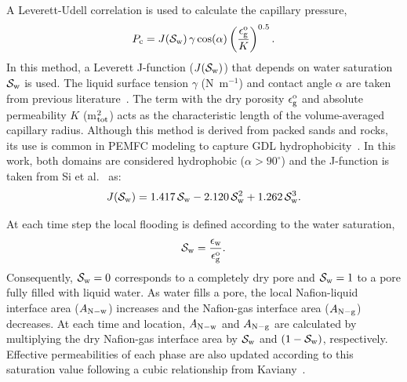 \documentclass[final,3p,times,twocolumn]{elsarticle}    %
\newcommand{\crr}[1]{\color{red} #1 \color{black}}
\begin{document}
A Leverett-Udell correlation is used to calculate the capillary pressure,
\begin{equation}
    P_{\rm c} = J({\cal S}_{\rm w})\, \gamma \cos(\alpha) 
    \left( \frac{\epsilon_{\rm g}^{\rm o}}{K} \right)^{0.5}.
\end{equation}
In this method, a Leverett J-function ($J({\cal S}_{\rm w})$) that depends on water saturation ${\cal S}_{\rm w}$ is used. The liquid surface tension $\gamma$ (N~m$^{-1}$) and contact angle $\alpha$ are taken from previous literature~\cite{bib:vetter_2019, bib:sigwadi_2019}. The term with the dry porosity $\epsilon_{\rm g}^{\rm o}$ and absolute permeability $K$ (m$^{2}_{\rm tot}$) acts as the characteristic length of the volume-averaged capillary radius. Although this method is derived from packed sands and rocks, its use is common in PEMFC modeling to capture GDL hydrophobicity~\cite{bib:si_2015}. In this work, both domains are considered hydrophobic ($\alpha > 90^{\circ}$) and the J-function is taken from Si et al.~\cite{bib:si_2015} as: 
\begin{equation}
    J({\cal S}_{\rm w}) = 1.417\,{\cal S}_{\rm w} - 2.120\,{\cal S}_{\rm w}^2 + 1.262\,{\cal S}_{\rm w}^3.
\end{equation}

At each time step the local flooding is defined according to the water saturation,
\begin{equation}
    {\cal S}_{\rm w} = \frac{\epsilon_{\rm w}}{\epsilon_{\rm g}^{\rm o}}.
\end{equation}
\crr{Consequently, ${\cal S}_{\rm w}=0$ corresponds to a completely dry pore and ${\cal S}_{\rm w}=1$ to a pore fully filled with liquid water. As water fills a pore, the local Nafion-liquid interface area ($A_{\rm N-w}$) increases and the Nafion-gas interface area ($A_{\rm N-g}$) decreases. At each time and location, $A_{\rm N-w}$ and $A_{\rm N-g}$ are calculated by multiplying the dry Nafion-gas interface area by ${\cal S}_{\rm w}$ and $\left(1-{\cal S}_{\rm w}\right)$, respectively.} Effective permeabilities of each phase are also updated according to this saturation value following a cubic relationship from Kaviany~\cite{bib:kaviany_2012}. 
\end{document}
